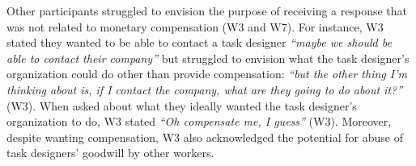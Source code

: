 Other participants struggled to envision the purpose of receiving a response that was not related to monetary compensation (W3 and W7). For instance, W3 stated they wanted to be able to contact a task designer \textit{``maybe we should be able to contact their company''} but struggled to envision what the task designer's organization could do other than provide compensation: \textit{``but the other thing I'm thinking about is, if I contact the company, what are they going to do about it?''} (W3). When asked about what they ideally wanted the task designer's organization to do, W3 stated \textit{``Oh compensate me, I guess''} (W3). Moreover, despite wanting compensation, W3 also acknowledged the potential for abuse of task designers' goodwill by other workers. 

